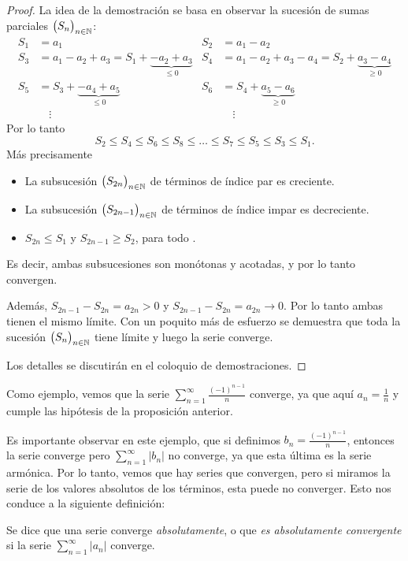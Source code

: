 \begin{proof}
La idea de la demostración se basa en observar la sucesión de sumas parciales $\big(S_n\big)_{n\in\mathbb{N}}$:
\begin{align*}
S_1 &= a_1 & 
S_2 &= a_1 - a_2
\\
S_3 &= a_1 - a_2 + a_3 = S_1 + \underbrace{-a_2+a_3}_{\le 0}&
S_4 &= a_1 - a_2 + a_3 - a_4 = S_2 + \underbrace{a_3 - a_4}_{\ge 0}
\\
S_5 &= S_3 + \underbrace{-a_4+a_5}_{\le 0}&
S_6 &= S_4 + \underbrace{a_5 - a_6}_{\ge 0}
\\
&\quad\vdots & &\quad\vdots
\end{align*}
Por lo tanto
\[
S_2 \le S_4 \le S_6 \le S_8 \le \dots \le S_7 \le S_5 \le S_3 \le S_1.
\]
Más precisamente
\begin{itemize}
    \item La subsucesión $\big(S_{2n}\big)_{n\in\mathbb{N}}$ de términos de índice par es creciente.
    \item La subsucesión $\big(S_{2n-1}\big)_{n\in\mathbb{N}}$ de términos de índice impar es decreciente.
    \item $S_{2n}\le S_1$ y $S_{2n-1}\ge S_2$, para todo \niN.
\end{itemize}
    Es decir, ambas subsucesiones son monótonas y acotadas, y por lo tanto convergen.

    Además, $S_{2n-1}-S_{2n} = a_{2n} > 0$ y $S_{2n-1}-S_{2n} = a_{2n}\to 0$. Por lo tanto ambas tienen el mismo límite.
    Con un poquito más de esfuerzo se demuestra que toda la sucesión $\big(S_n\big)_{n\in\mathbb{N}}$
    tiene límite y luego la serie converge.

    Los detalles se discutirán en el coloquio de demostraciones.
\end{proof}

Como ejemplo, vemos que la serie $\sum_{n=1}^\infty \frac{(-1)^{n-1}}{n}$ converge, ya que aquí $a_n = \frac1n$ y cumple las hipótesis de la proposición anterior.

Es importante observar en este ejemplo, que si definimos $b_n = \frac{(-1)^{n-1}}{n}$, 
entonces la serie \seriebn converge pero $\sum_{n=1}^\infty |b_n|$ no converge, ya que esta última es la serie armónica. Por lo tanto, vemos que hay series que convergen, pero si miramos la serie de los valores absolutos de los términos, esta puede no converger.
Esto nos conduce a la siguiente definición:

\begin{definition}
    Se dice que una serie \seriean converge \emph{absolutamente}, o que \emph{es absolutamente convergente} si la serie $\sum_{n=1}^\infty |a_n|$ converge.
\end{definition}

